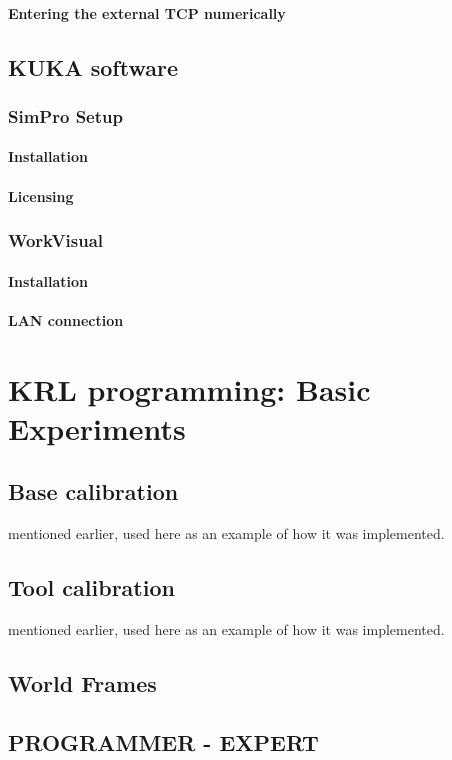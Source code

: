 \documentclass{book}
\begin{document}
				\subsubsection{Entering the external TCP numerically}
		\newpage
		\section{KUKA software}
			\subsection{SimPro Setup}
				\subsubsection{Installation}
				\subsubsection{Licensing}
			\subsection{WorkVisual}
				\subsubsection{Installation}			\subsubsection{LAN connection}
		
		
	\chapter{KRL programming: Basic Experiments}
		\section{Base calibration}
		mentioned earlier, used here as an example of how it was implemented.
		\section{Tool calibration}
		mentioned earlier, used here as an example of how it was implemented.
		\section{World Frames}
		
		\newpage
		\section{PROGRAMMER - EXPERT}
\end{document}

